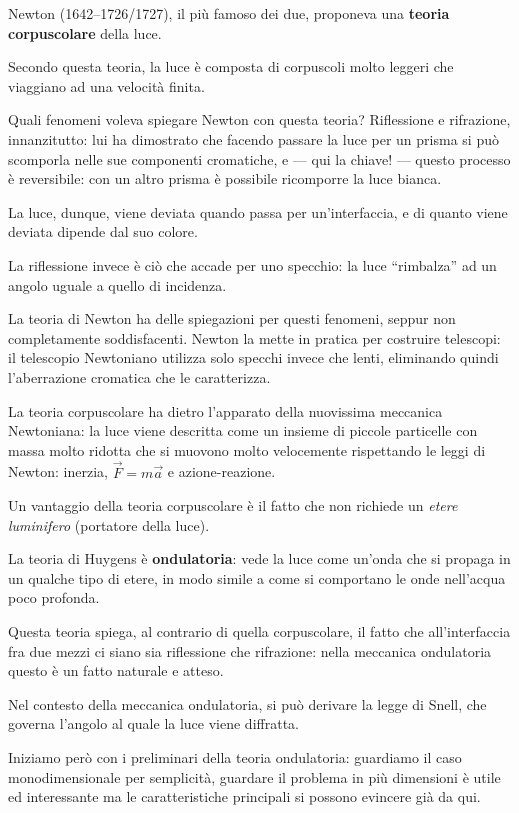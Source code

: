 \documentclass{article}
\begin{document}
Newton (1642--1726/1727), il più famoso dei due, proponeva una \textbf{teoria corpuscolare} della luce. 

Secondo questa teoria, la luce è composta di corpuscoli molto leggeri che viaggiano ad una velocità finita. 

Quali fenomeni voleva spiegare Newton con questa teoria?
Riflessione e rifrazione, innanzitutto: lui ha dimostrato che facendo passare la luce per un prisma si può scomporla nelle sue componenti cromatiche, e --- qui la chiave! --- questo processo è reversibile: con un altro prisma è possibile ricomporre la luce bianca.

La luce, dunque, viene deviata quando passa per un'interfaccia, e di quanto viene deviata dipende dal suo colore. 

La riflessione invece è ciò che accade per uno specchio: la luce ``rimbalza'' ad un angolo uguale a quello di incidenza.

La teoria di Newton ha delle spiegazioni per questi fenomeni, seppur non completamente soddisfacenti.
Newton la mette in pratica per costruire telescopi: il telescopio Newtoniano utilizza solo specchi invece che lenti, eliminando quindi l'aberrazione cromatica che le caratterizza. 

La teoria corpuscolare ha dietro l'apparato della nuovissima meccanica Newtoniana: la luce viene descritta come un insieme di piccole particelle con massa molto ridotta che si muovono molto velocemente rispettando le leggi di Newton: inerzia, \(\vec{F} = m \vec{a}\) e azione-reazione.

Un vantaggio della teoria corpuscolare è il fatto che non richiede un \emph{etere luminifero} (portatore della luce). 

La teoria di Huygens è \textbf{ondulatoria}: vede la luce come un'onda che si propaga in un qualche tipo di etere, in modo simile a come si comportano le onde nell'acqua poco profonda.

Questa teoria spiega, al contrario di quella corpuscolare, il fatto che all'interfaccia fra due mezzi ci siano sia riflessione che rifrazione: nella meccanica ondulatoria questo è un fatto naturale e atteso.

Nel contesto della meccanica ondulatoria, si può derivare la legge di Snell, che governa l'angolo al quale la luce viene diffratta. 

Iniziamo però con i preliminari della teoria ondulatoria: guardiamo il caso monodimensionale per semplicità, guardare il problema in più dimensioni è utile ed interessante ma le caratteristiche principali si possono evincere già da qui. 
\end{document}
